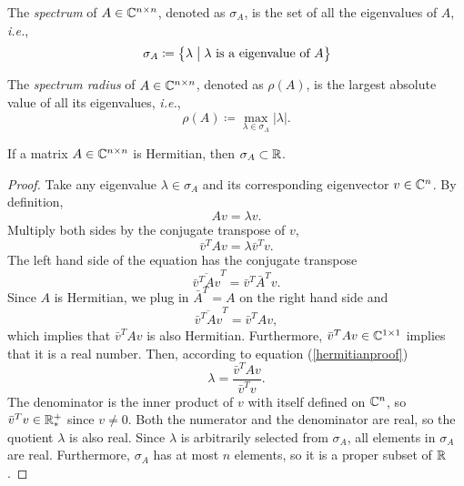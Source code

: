 \begin{definition}[Spectrum]
The \emph{spectrum} of \(A\in\mathbb{C}^{n\times n}\), denoted as \(\sigma_A\), is the set of all the eigenvalues of $A$, \textit{i.e.},
\begin{equation*}
\sigma_A\coloneqq\Set{\lambda}{\lambda \text{ is a eigenvalue of }A}
\end{equation*}
\end{definition}


\begin{definition}
The \emph{spectrum radius} of \(A\in\mathbb{C}^{n\times n}\), denoted as \(\rho(A)\), is the largest absolute value of all its eigenvalues, \textit{i.e.},
\begin{equation*}
\rho(A)\coloneqq\max_{\lambda\in\sigma_A}|\lambda|.
\end{equation*}
\end{definition}


\begin{theorem}
If a matrix \(A\in\mathbb{C}^{n\times n}\) is Hermitian, then \(\sigma_A\subset\mathbb{R}\).
\end{theorem}
\begin{proof}
Take any eigenvalue \(\lambda\in\sigma_A\) and its corresponding eigenvector \(v\in\mathbb{C}^n\).
By definition,
\begin{equation*}
Av=\lambda v.
\end{equation*}
Multiply both sides by the conjugate transpose of $v$,
\begin{equation}\label{hermitianproof}
\bar{v}^T Av=\lambda \bar{v}^T v.
\end{equation}
The left hand side of the equation has the conjugate transpose
\begin{equation*}
\overline{\bar{v}^T Av}^T=\bar{v}^T\bar{A}^T v.
\end{equation*}
Since $A$ is Hermitian, we plug in \(\bar{A}^T=A\) on the right hand side and
\begin{equation*}
\overline{\bar{v}^T Av}^T=\bar{v}^TA v,
\end{equation*}
which implies that \(\bar{v}^T Av\) is also Hermitian.
Furthermore, \(\bar{v}^T Av\in\mathbb{C}^{1\times1}\) implies that it is a real number.
Then, according to equation (\ref{hermitianproof})
\begin{equation*}
\lambda=\frac{\bar{v}^T Av}{\bar{v}^T v}.
\end{equation*}
The denominator is the inner product of $v$ with itself defined on \(\mathbb{C}^n\), so \(\bar{v}^T v\in\mathbb{R}_*^+\) since \(v\neq0\).
Both the numerator and the denominator are real, so the quotient $\lambda$ is also real.
Since $\lambda$ is arbitrarily selected from \(\sigma_A\), all elements in \(\sigma_A\) are real.
Furthermore, \(\sigma_A\) has at most $n$ elements, so it is a proper subset of \(\mathbb{R}\).
\end{proof}

